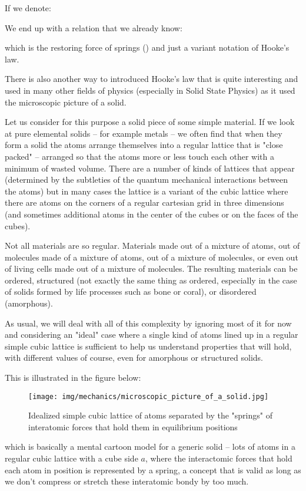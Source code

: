 	If we denote:
	
	We end up with a relation that we already know:
	
	which is the restoring force of springs () and just a variant notation of Hooke's law.
	
	There is also another way to introduced Hooke's law that is quite interesting and used in many other fields of physics (especially in Solid State Physics) as it used the microscopic picture of a solid.

	Let us consider for this purpose a solid piece of some simple material. If we look at pure elemental solids – for
example metals – we often find that when they form a solid the atoms arrange themselves into a regular lattice that is "close packed" – arranged so that the atoms more or less touch each other with a minimum of wasted volume. There are a number of kinds of lattices that appear (determined by the subtleties of the quantum mechanical interactions between the atoms) but in many cases the lattice is a variant of the cubic lattice where there are atoms on the corners of a regular cartesian grid in three dimensions (and sometimes additional atoms in the center of the cubes or on the faces of the cubes).

	Not all materials are so regular. Materials made out of a mixture of atoms, out of molecules made of a mixture of atoms, out of a mixture of molecules, or even out of living cells made out of a mixture of molecules. The resulting materials can be ordered, structured (not exactly the same thing as ordered, especially in the case of solids formed by life processes such as bone or coral), or disordered (amorphous).

	As usual, we will deal with all of this complexity by ignoring most of it for now and considering an "ideal" case where a single kind of atoms lined up in a regular simple cubic lattice is sufficient to help us understand properties that will hold, with different values of course, even for amorphous or structured solids.

	This is illustrated in the figure below:
	\begin{figure}[H]
		\centering
		\texttt{[image: img/mechanics/microscopic\_picture\_of\_a\_solid.jpg]}
		\caption{Idealized simple cubic lattice of atoms separated by the "springs" of interatomic forces that hold them in equilibrium positions}
	\end{figure}
	which is basically a mental cartoon model for a generic solid – lots of atoms in a regular cubic lattice with a cube side $a$, where the interactomic forces that hold each atom in position is represented by a spring, a concept that is valid as long as we don't compress or stretch these interatomic bondy by too much.
	
